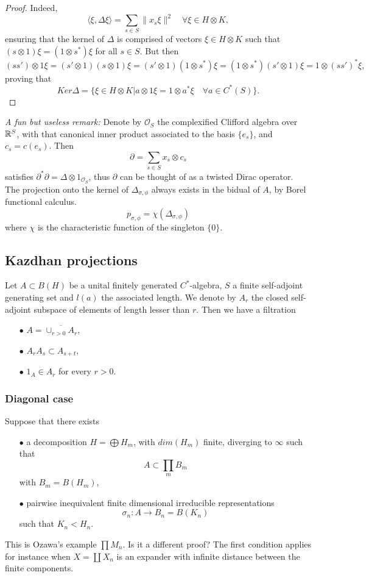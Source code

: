 \begin{proof}
Indeed,
\[\langle \xi , \Delta \xi \rangle = \sum_{s\in S} \| x_s \xi\|^2 \quad \forall \xi \in H\otimes K,\]
ensuring that the kernel of $\Delta$ is comprised of vectors $\xi \in H\otimes K$ such that $(s\otimes 1 )\xi = (1\otimes s^*) \xi$ for all $s\in S$. But then 
\[(ss')\otimes 1 \xi = (s'\otimes 1)(s\otimes 1) \xi = (s'\otimes 1)(1\otimes s^*)\xi = (1\otimes s^*)(s'\otimes 1)\xi = 1\otimes (ss')^* \xi,\]
proving that 
\[Ker \Delta = \{\xi \in H\otimes K | a\otimes 1 \xi = 1\otimes a^* \xi \quad \forall a \in C^*(S) \}.\]
\end{proof}

\textit{A fun but useless remark:} Denote by $\mathcal O_S$ the complexified Clifford algebra over $\mathbb R^S$, with that canonical inner product associated to the basis $\{e_s\}$, and $c_s = c(e_s)$. Then
\[\partial = \sum_{s\in S} x_s \otimes c_s\]  
satisfies $\partial^* \partial = \Delta \otimes 1_{\mathcal O_S}$, thus $\partial$ can be thought of as a twisted Dirac operator.\\

The projection onto the kernel of $\Delta_{\sigma,\phi}$ always exists in the bidual of $A$, by Borel functional calculus.
\[ p_{\sigma,\phi} = \chi(\Delta_{\sigma,\phi})\]
where $\chi$ is the characteristic function of the singleton $\{0\}$.

\subsection{Kazdhan projections}

Let $A\subset B(H)$ be a unital finitely generated $C^\ast$-algebra, $S$ a finite self-adjoint generating set and $l(a)$ the associated length. We denote by $A_r$ the closed self-adjoint subspace of elements of length lesser than $r$. Then we have a filtration
\begin{itemize}
\item[$\bullet$] $A = \overline{\cup_{r>0} A_r}$,
\item[$\bullet$] $A_r A_s \subset A_{s+t}$,
\item[$\bullet$]  $1_A \in A_r$ for every $r>0$.
\end{itemize}

\subsubsection*{Diagonal case}

Suppose that there exists 
\begin{itemize}
\item[$\bullet$] a decomposition $H=\bigoplus H_m$, with $dim(H_m)$ finite, diverging to $\infty$ such that 
\[A \subset \prod_{m} B_m \]
with $B_m = B(H_m)$,
\item[$\bullet$] pairwise inequivalent finite dimensional irreducible representations \[\sigma_n : A \rightarrow B_n= B(K_n)\] such that $K_n < H_n$.
\end{itemize} 
This is Ozawa's example $\prod M_n$. Is it a different proof? The first condition applies for instance when $X=\coprod X_n$ is an expander with infinite distance between the finite components.\\

